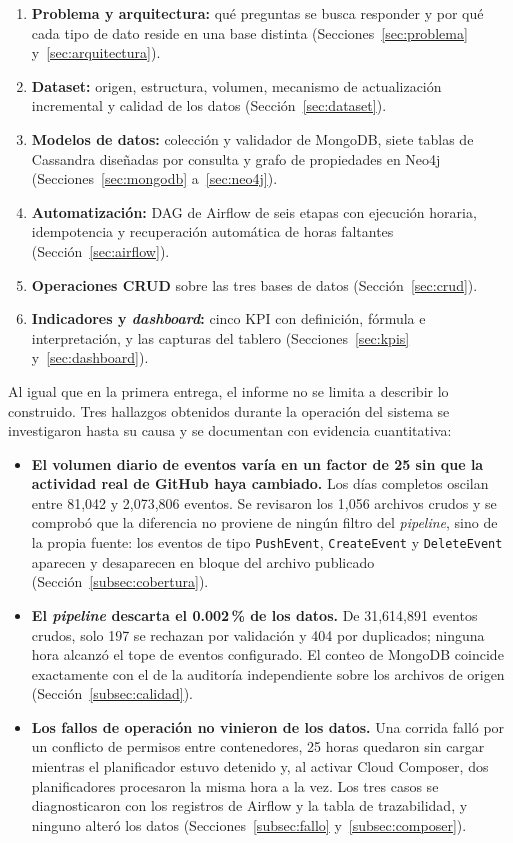 \begin{enumerate}[leftmargin=*]
    \item \textbf{Problema y arquitectura:} qué preguntas se busca responder y por qué cada tipo de dato reside en una base distinta (Secciones~\ref{sec:problema} y~\ref{sec:arquitectura}).
    \item \textbf{Dataset:} origen, estructura, volumen, mecanismo de actualización incremental y calidad de los datos (Sección~\ref{sec:dataset}).
    \item \textbf{Modelos de datos:} colección y validador de MongoDB, siete tablas de Cassandra diseñadas por consulta y grafo de propiedades en Neo4j (Secciones~\ref{sec:mongodb} a~\ref{sec:neo4j}).
    \item \textbf{Automatización:} DAG de Airflow de seis etapas con ejecución horaria, idempotencia y recuperación automática de horas faltantes (Sección~\ref{sec:airflow}).
    \item \textbf{Operaciones CRUD} sobre las tres bases de datos (Sección~\ref{sec:crud}).
    \item \textbf{Indicadores y \textit{dashboard}:} cinco KPI con definición, fórmula e interpretación, y las capturas del tablero (Secciones~\ref{sec:kpis} y~\ref{sec:dashboard}).
\end{enumerate}

Al igual que en la primera entrega, el informe no se limita a describir lo construido. Tres hallazgos obtenidos durante la operación del sistema se investigaron hasta su causa y se documentan con evidencia cuantitativa:

\begin{itemize}[leftmargin=*]
    \item \textbf{El volumen diario de eventos varía en un factor de 25 sin que la actividad real de GitHub haya cambiado.} Los días completos oscilan entre 81,042 y 2,073,806 eventos. Se revisaron los 1,056 archivos crudos y se comprobó que la diferencia no proviene de ningún filtro del \textit{pipeline}, sino de la propia fuente: los eventos de tipo \texttt{PushEvent}, \texttt{CreateEvent} y \texttt{DeleteEvent} aparecen y desaparecen en bloque del archivo publicado (Sección~\ref{subsec:cobertura}).
    \item \textbf{El \textit{pipeline} descarta el 0.002\,\% de los datos.} De 31,614,891 eventos crudos, solo 197 se rechazan por validación y 404 por duplicados; ninguna hora alcanzó el tope de eventos configurado. El conteo de MongoDB coincide exactamente con el de la auditoría independiente sobre los archivos de origen (Sección~\ref{subsec:calidad}).
    \item \textbf{Los fallos de operación no vinieron de los datos.} Una corrida falló por un conflicto de permisos entre contenedores, 25 horas quedaron sin cargar mientras el planificador estuvo detenido y, al activar Cloud Composer, dos planificadores procesaron la misma hora a la vez. Los tres casos se diagnosticaron con los registros de Airflow y la tabla de trazabilidad, y ninguno alteró los datos (Secciones~\ref{subsec:fallo} y~\ref{subsec:composer}).
\end{itemize}

